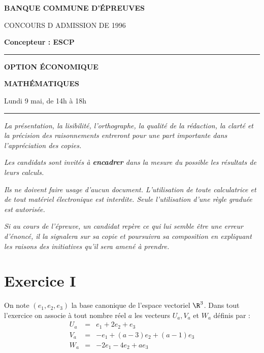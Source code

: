 \documentclass[11pt]{article}%
\begin{document}

\begin{center}
{\LARG\E\textbf{BANQUE COMMUNE D'ÉPREUVES}}



{\large \textsc{CONCOURS D ADMISSION DE 1996}}



{\large \textbf{Concepteur : ESCP}}



\rule{2.39cm}{0.05cm}



{\Large \textbf{OPTION ÉCONOMIQUE}}



{\Large \textbf{MATHÉMATIQUES }}



{\Large Lundi 9 mai, de 14h à 18h}



\rule{2.39cm}{0.05cm}
\end{center}

\textit{La présentation, la lisibilité, l'orthographe, la qualité
de la rédaction, la clarté et la précision des raisonnements
entreront pour une part importante dans l'appréciation des copies.}

\textit{Les candidats sont invités à \textbf{encadrer} dans la mesure
du possible les résultats de leurs calculs.}

\textit{Ils ne doivent faire usage d'aucun document. L'utilisation de
toute
calculatrice et de tout matériel électronique est interdite. Seule
l'utilisation d'une règle graduée est autorisée.}

\textit{Si au cours de l'épreuve, un candidat repère ce qui lui semble
être une erreur d'énoncé, il la signalera sur sa copie et
poursuivra sa composition en expliquant les raisons des initiatives
qu'il sera
amené à prendre.}

\vspace*{3cm}

\section*{Exercice I}

On note $\left( e_{1},e_{2},e_{3}\right) $ la base canonique de
l'espace
vectoriel $\R^{3}$. Dans tout l'exercice on associe à tout nombre réel
$a$ les vecteurs $U_{a},V_{a}$ et $W_{a}$ définis par : 
\begin{eqnarray*}
U_{a} & = & e_{1} + 2e_{2} + e_{3} \\
V_{a} & = & -e_{1} + (a-3)e_{2} + (a-1)e_{3} \\
W_{a} & = & -2e_{1}-4e_{2} + ae_{3}
\end{eqnarray*}
\end{document}
